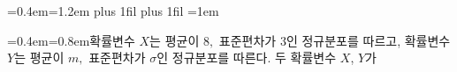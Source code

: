 \documentclass[12pt,varwidth=16cm]{standalone}
\newcommand{\YggVtwoBaselineGuide}{}
\begin{document}
\raggedright
\lineskiplimit=0.4em\lineskip=1.2em
\begingroup
\fontsize{12.00pt}{14.16pt}\selectfont
\rightskip=0pt plus 1fil\relax
\parfillskip=0pt plus 1fil\relax
\parindent=0pt
\emergencystretch=0pt
\leftskip=1em
\noindent\YggVtwoBaselineGuide{}\enspace
{\fontsize{12.00pt}{14.16pt}\selectfont\parskip=0pt\lineskiplimit=0.4em\lineskip=0.8em\YggVtwoBaselineGuide{}확률변수 $\displaystyle X$는 평균이 $\displaystyle 8,$ 표준편차가 $\displaystyle 3$인 정규분포를 따르고, 확률변수 $\displaystyle Y$는 평균이 $\displaystyle m,$ 표준편차가 $\displaystyle \sigma$인 정규분포를 따른다. 두 확률변수 $\displaystyle X$, $\displaystyle Y$가\par}
\end{document}
